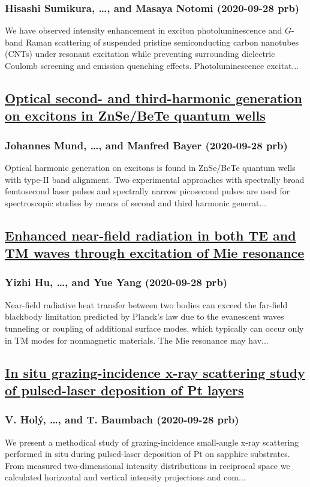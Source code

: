 \subsubsection*{Hisashi Sumikura, \dots, and Masaya Notomi (2020-09-28 prb)}
We have observed intensity enhancement in exciton photoluminescence and $G$-band Raman scattering of suspended pristine semiconducting carbon nanotubes (CNTs) under resonant excitation while preventing surrounding dielectric Coulomb screening and emission quenching effects. Photoluminescence excitat...
\subsection*{\href{http://link.aps.org/doi/10.1103/PhysRevB.102.125433}{Optical second- and third-harmonic generation on excitons in ZnSe/BeTe quantum wells}}
\subsubsection*{Johannes Mund, \dots, and Manfred Bayer (2020-09-28 prb)}
Optical harmonic generation on excitons is found in ZnSe/BeTe quantum wells with type-II band alignment. Two experimental approaches with spectrally broad femtosecond laser pulses and spectrally narrow picosecond pulses are used for spectroscopic studies by means of second and third harmonic generat...
\subsection*{\href{http://link.aps.org/doi/10.1103/PhysRevB.102.125434}{Enhanced near-field radiation in both TE and TM waves through excitation of Mie resonance}}
\subsubsection*{Yizhi Hu, \dots, and Yue Yang (2020-09-28 prb)}
Near-field radiative heat transfer between two bodies can exceed the far-field blackbody limitation predicted by Planck's law due to the evanescent waves tunneling or coupling of additional surface modes, which typically can occur only in TM modes for nonmagnetic materials. The Mie resonance may hav...
\subsection*{\href{http://link.aps.org/doi/10.1103/PhysRevB.102.125435}{In situ grazing-incidence x-ray scattering study of pulsed-laser deposition of Pt layers}}
\subsubsection*{V. Holý, \dots, and T. Baumbach (2020-09-28 prb)}
We present a methodical study of grazing-incidence small-angle x-ray scattering performed in situ during pulsed-laser deposition of Pt on sapphire substrates. From measured two-dimensional intensity distributions in reciprocal space we calculated horizontal and vertical intensity projections and com...
